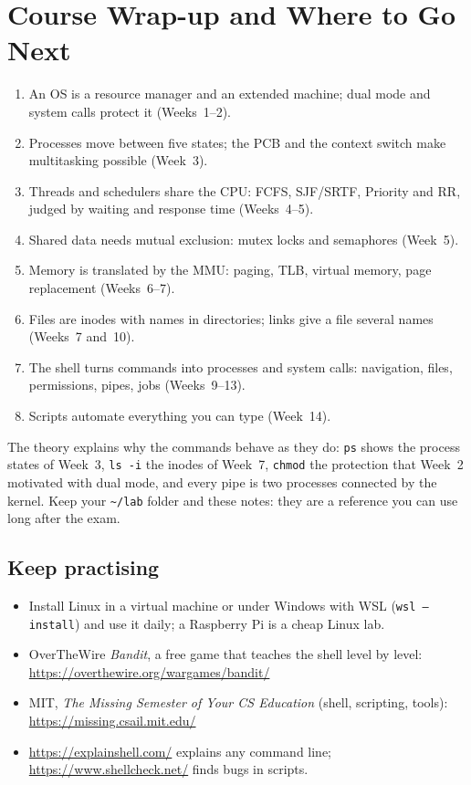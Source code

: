 \documentclass[11pt,a4paper]{article}
\newcommand{\cmd}[1]{\texttt{#1}}
\begin{document}
\section{Course Wrap-up and Where to Go Next}

\begin{keyidea}
\begin{enumerate}[leftmargin=1.4em]
  \item An OS is a resource manager and an extended machine; dual mode and system calls protect it (Weeks~1--2).
  \item Processes move between five states; the PCB and the context switch make multitasking possible (Week~3).
  \item Threads and schedulers share the CPU: FCFS, SJF/SRTF, Priority and RR, judged by waiting and response time (Weeks~4--5).
  \item Shared data needs mutual exclusion: mutex locks and semaphores (Week~5).
  \item Memory is translated by the MMU: paging, TLB, virtual memory, page replacement (Weeks~6--7).
  \item Files are inodes with names in directories; links give a file several names (Weeks~7 and~10).
  \item The shell turns commands into processes and system calls: navigation, files, permissions, pipes, jobs (Weeks~9--13).
  \item Scripts automate everything you can type (Week~14).
\end{enumerate}
\end{keyidea}

The theory explains why the commands behave as they do: \cmd{ps} shows the process states of Week~3, \cmd{ls -i} the inodes of Week~7, \cmd{chmod} the protection that Week~2 motivated with dual mode, and every pipe is two processes connected by the kernel. Keep your \texttt{\textasciitilde/lab} folder and these notes: they are a reference you can use long after the exam.

\subsection*{Keep practising}
\begin{itemize}
  \item Install Linux in a virtual machine or under Windows with WSL (\cmd{wsl --install}) and use it daily; a Raspberry Pi is a cheap Linux lab.
  \item OverTheWire \emph{Bandit}, a free game that teaches the shell level by level: \url{https://overthewire.org/wargames/bandit/}
  \item MIT, \emph{The Missing Semester of Your CS Education} (shell, scripting, tools): \url{https://missing.csail.mit.edu/}
  \item \url{https://explainshell.com/} explains any command line; \url{https://www.shellcheck.net/} finds bugs in scripts.
\end{itemize}
\end{document}
